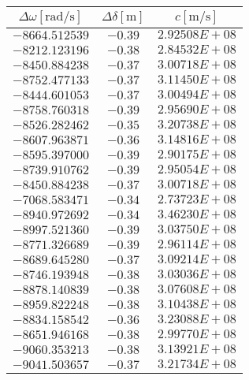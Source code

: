 \documentclass{article} %
\begin{document}
    \begin{table}
        \centering
        \begin{tabular}{||c|c|c||}
            \hline
            $\Delta \omega [\text{rad/s}]$ & $\Delta \delta [\text{m}]$ & $c [\text{m/s}]$ \\
            \hline\hline
            $-8664.512539$ & $-0.39$ & $2.92508E+08$ \\\hline
            $-8212.123196$ & $-0.38$ & $2.84532E+08$ \\\hline
            $-8450.884238$ & $-0.37$ & $3.00718E+08$ \\\hline
            $-8752.477133$ & $-0.37$ & $3.11450E+08$ \\\hline
            $-8444.601053$ & $-0.37$ & $3.00494E+08$ \\\hline
            $-8758.760318$ & $-0.39$ & $2.95690E+08$ \\\hline
            $-8526.282462$ & $-0.35$ & $3.20738E+08$ \\\hline
            $-8607.963871$ & $-0.36$ & $3.14816E+08$ \\\hline
            $-8595.397000$ & $-0.39$ & $2.90175E+08$ \\\hline
            $-8739.910762$ & $-0.39$ & $2.95054E+08$ \\\hline
            $-8450.884238$ & $-0.37$ & $3.00718E+08$ \\\hline
            $-7068.583471$ & $-0.34$ & $2.73723E+08$ \\\hline
            $-8940.972692$ & $-0.34$ & $3.46230E+08$ \\\hline
            $-8997.521360$ & $-0.39$ & $3.03750E+08$ \\\hline
            $-8771.326689$ & $-0.39$ & $2.96114E+08$ \\\hline
            $-8689.645280$ & $-0.37$ & $3.09214E+08$ \\\hline
            $-8746.193948$ & $-0.38$ & $3.03036E+08$ \\\hline
            $-8878.140839$ & $-0.38$ & $3.07608E+08$ \\\hline
            $-8959.822248$ & $-0.38$ & $3.10438E+08$ \\\hline
            $-8834.158542$ & $-0.36$ & $3.23088E+08$ \\\hline
            $-8651.946168$ & $-0.38$ & $2.99770E+08$ \\\hline
            $-9060.353213$ & $-0.38$ & $3.13921E+08$ \\\hline
            $-9041.503657$ & $-0.37$ & $3.21734E+08$ \\\hline

\end{tabular}
\end{table}
\end{document}
